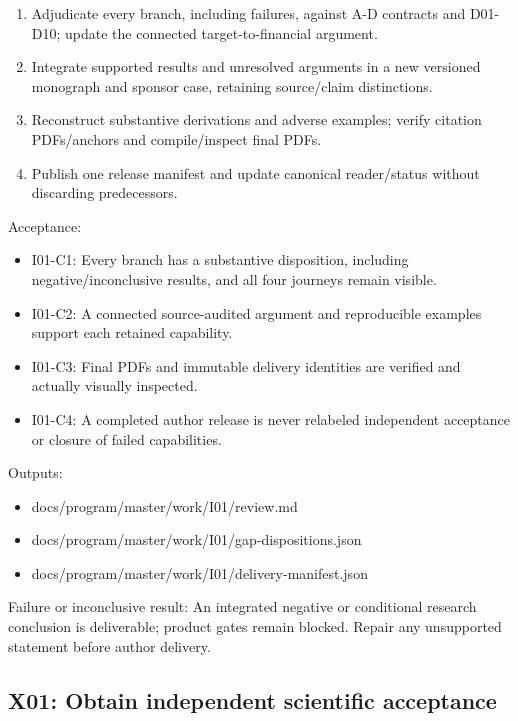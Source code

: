 \documentclass[
  11pt,
  a4paper,
]{article}
\providecommand{\tightlist}{%
  \setlength{\itemsep}{0pt}\setlength{\parskip}{0pt}}
\begin{document}
\begin{enumerate}
\def\labelenumi{\arabic{enumi}.}
\tightlist
\item
  Adjudicate every branch, including failures, against A-D contracts and
  D01-D10; update the connected target-to-financial argument.
\item
  Integrate supported results and unresolved arguments in a new
  versioned monograph and sponsor case, retaining source/claim
  distinctions.
\item
  Reconstruct substantive derivations and adverse examples; verify
  citation PDFs/anchors and compile/inspect final PDFs.
\item
  Publish one release manifest and update canonical reader/status
  without discarding predecessors.
\end{enumerate}

Acceptance:

\begin{itemize}
\tightlist
\item
  I01-C1: Every branch has a substantive disposition, including
  negative/inconclusive results, and all four journeys remain visible.
\item
  I01-C2: A connected source-audited argument and reproducible examples
  support each retained capability.
\item
  I01-C3: Final PDFs and immutable delivery identities are verified and
  actually visually inspected.
\item
  I01-C4: A completed author release is never relabeled independent
  acceptance or closure of failed capabilities.
\end{itemize}

Outputs:

\begin{itemize}
\tightlist
\item
  docs/program/master/work/I01/review.md
\item
  docs/program/master/work/I01/gap-dispositions.json
\item
  docs/program/master/work/I01/delivery-manifest.json
\end{itemize}

Failure or inconclusive result: An integrated negative or conditional
research conclusion is deliverable; product gates remain blocked. Repair
any unsupported statement before author delivery.

\hypertarget{x01-obtain-independent-scientific-acceptance}{%
\subsection{X01: Obtain independent scientific
acceptance}\label{x01-obtain-independent-scientific-acceptance}}
\end{document}
